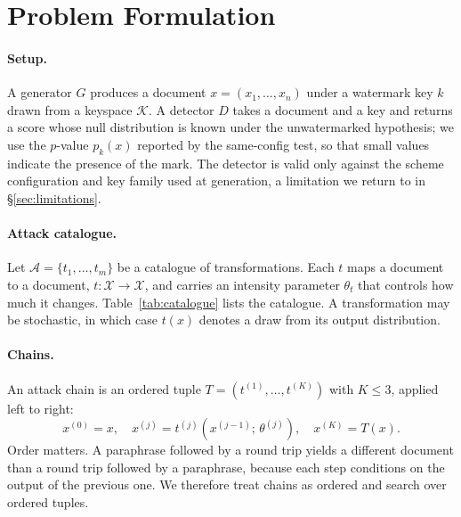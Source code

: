 \section{Problem Formulation}
\label{sec:problem}

\paragraph{Setup.}
A generator $G$ produces a document $x = (x_1, \dots, x_n)$ under a watermark key $k$ drawn from a keyspace $\mathcal{K}$. A detector $D$ takes a document and a key and returns a score whose null distribution is known under the unwatermarked hypothesis; we use the $p$-value $p_k(x)$ reported by the same-config test, so that small values indicate the presence of the mark. The detector is valid only against the scheme configuration and key family used at generation, a limitation we return to in \S\ref{sec:limitations}.

\paragraph{Attack catalogue.}
Let $\mathcal{A} = \{t_1, \dots, t_m\}$ be a catalogue of transformations. Each $t$ maps a document to a document, $t: \mathcal{X} \to \mathcal{X}$, and carries an intensity parameter $\theta_t$ that controls how much it changes. Table~\ref{tab:catalogue} lists the catalogue. A transformation may be stochastic, in which case $t(x)$ denotes a draw from its output distribution.

\paragraph{Chains.}
An attack chain is an ordered tuple $T = (t^{(1)}, \dots, t^{(K)})$ with $K \le 3$, applied left to right:
\begin{equation}
  x^{(0)} = x, \quad x^{(j)} = t^{(j)}\!\left(x^{(j-1)};\, \theta^{(j)}\right), \quad x^{(K)} = T(x).
\end{equation}
Order matters. A paraphrase followed by a round trip yields a different document than a round trip followed by a paraphrase, because each step conditions on the output of the previous one. We therefore treat chains as ordered and search over ordered tuples.

